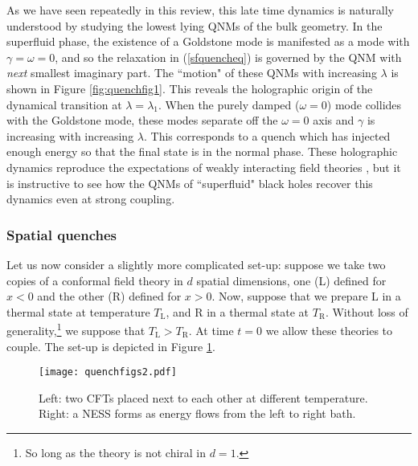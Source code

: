 \documentclass[10pt, oneside]{book}
\begin{document}
\begin{doublespace}
As we have seen repeatedly in this review, this late time dynamics is naturally understood by studying the lowest lying QNMs of the bulk geometry.  In the superfluid phase, the existence of a Goldstone mode is manifested as a mode with $\gamma=\omega=0$, and so the relaxation in (\ref{sfquencheq}) is governed by the QNM with \emph{next} smallest imaginary part.   The ``motion" of these QNMs with increasing $\lambda$ is shown in Figure \ref{fig:quenchfig1}.   This reveals the holographic origin of the dynamical transition at $\lambda=\lambda_1$.   When the purely damped ($\omega=0$) mode collides with the Goldstone mode, these modes separate off the $\omega=0$ axis and $\gamma$ is increasing with increasing $\lambda$.   This corresponds to a quench which has injected enough energy so that the final state is in the normal phase.    These holographic dynamics reproduce the expectations of weakly interacting field theories \cite{barankov}, but it is instructive to see how the QNMs of ``superfluid" black holes recover this dynamics even at strong coupling.

\subsubsection{Spatial quenches}
Let us now consider a slightly more complicated set-up:  suppose we take two copies of a conformal field theory in $d$ spatial dimensions, one (L) defined for $x<0$ and the other (R) defined for $x>0$.  Now, suppose that we prepare L in a thermal state at temperature $T_{\mathrm{L}}$, and R in a thermal state at $T_{\mathrm{R}}$.    Without loss of generality,\footnote{So long as the theory is not chiral in $d=1$.}  we suppose that $T_{\mathrm{L}}>T_{\mathrm{R}}$.    At time $t=0$ we allow these theories to couple.  The set-up is depicted in Figure \ref{figness}.

\begin{figure}[h]
\centering
\texttt{[image: quenchfigs2.pdf]}
\caption{Left:  two CFTs placed next to each other at different temperature.   Right: a NESS forms as energy flows from the left to right bath.}
\label{figness}
\end{figure}



\end{doublespace}
\end{document}
